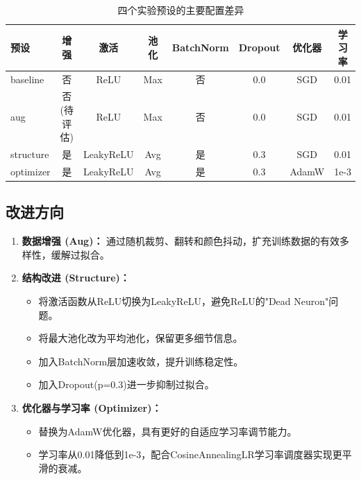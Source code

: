 \documentclass[12pt,a4paper]{ctexart}
\begin{document}
\begin{table}[H]
    \centering
    \small
    \begin{tabular}{lccccccc}
        \toprule
        \textbf{预设} & \textbf{增强} & \textbf{激活} & \textbf{池化} & \textbf{BatchNorm} & \textbf{Dropout} & \textbf{优化器} & \textbf{学习率} \\
        \midrule
        baseline & 否 & ReLU & Max & 否 & 0.0 & SGD & 0.01 \\
        aug & 否(待评估) & ReLU & Max & 否 & 0.0 & SGD & 0.01 \\
        structure & 是 & LeakyReLU & Avg & 是 & 0.3 & SGD & 0.01 \\
        optimizer & 是 & LeakyReLU & Avg & 是 & 0.3 & AdamW & 1e-3 \\
        \bottomrule
    \end{tabular}
    \caption{四个实验预设的主要配置差异}
\end{table}

\subsection{改进方向}

\begin{enumerate}
    \item \textbf{数据增强 (Aug)：} 通过随机裁剪、翻转和颜色抖动，扩充训练数据的有效多样性，缓解过拟合。
    
    \item \textbf{结构改进 (Structure)：} 
    \begin{itemize}
        \item 将激活函数从ReLU切换为LeakyReLU，避免ReLU的"Dead Neuron"问题。
        \item 将最大池化改为平均池化，保留更多细节信息。
        \item 加入BatchNorm层加速收敛，提升训练稳定性。
        \item 加入Dropout(p=0.3)进一步抑制过拟合。
    \end{itemize}
    
    \item \textbf{优化器与学习率 (Optimizer)：}
    \begin{itemize}
        \item 替换为AdamW优化器，具有更好的自适应学习率调节能力。
        \item 学习率从0.01降低到1e-3，配合CosineAnnealingLR学习率调度器实现更平滑的衰减。
    \end{itemize}
\end{enumerate}
\end{document}
